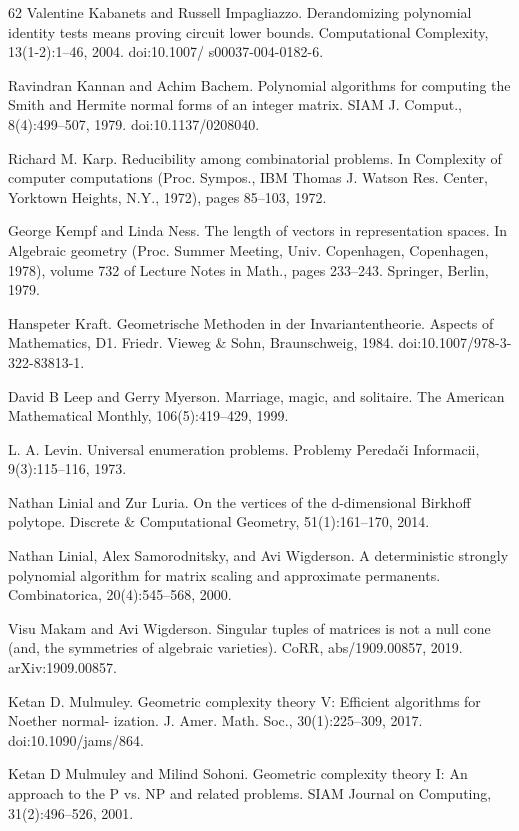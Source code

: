 \begin{thebibliography}{62}
Valentine Kabanets and Russell Impagliazzo. Derandomizing polynomial identity tests means proving circuit lower bounds. Computational Complexity, 13(1-2):1–46, 2004. doi:10.1007/ s00037-004-0182-6.

Ravindran Kannan and Achim Bachem. Polynomial algorithms for computing the Smith and Hermite normal forms of an integer matrix. SIAM J. Comput., 8(4):499–507, 1979. doi:10.1137/0208040.

Richard M. Karp. Reducibility among combinatorial problems. In Complexity of computer computations (Proc. Sympos., IBM Thomas J. Watson Res. Center, Yorktown Heights, N.Y., 1972), pages 85–103, 1972.

George Kempf and Linda Ness. The length of vectors in representation spaces. In Algebraic geometry (Proc. Summer Meeting, Univ. Copenhagen, Copenhagen, 1978), volume 732 of Lecture Notes in Math., pages 233–243. Springer, Berlin, 1979.

Hanspeter Kraft. Geometrische Methoden in der Invariantentheorie. Aspects of Mathematics, D1. Friedr. Vieweg \& Sohn, Braunschweig, 1984. doi:10.1007/978-3-322-83813-1.

David B Leep and Gerry Myerson. Marriage, magic, and solitaire. The American Mathematical Monthly, 106(5):419–429, 1999.

L. A. Levin. Universal enumeration problems. Problemy Peredači Informacii, 9(3):115–116, 1973.

Nathan Linial and Zur Luria. On the vertices of the d-dimensional Birkhoff polytope. Discrete \& Computational Geometry, 51(1):161–170, 2014.

Nathan Linial, Alex Samorodnitsky, and Avi Wigderson. A deterministic strongly polynomial algorithm for matrix scaling and approximate permanents. Combinatorica, 20(4):545–568, 2000.

Visu Makam and Avi Wigderson. Singular tuples of matrices is not a null cone (and, the symmetries of algebraic varieties). CoRR, abs/1909.00857, 2019. arXiv:1909.00857.

Ketan D. Mulmuley. Geometric complexity theory V: Efficient algorithms for Noether normal- ization. J. Amer. Math. Soc., 30(1):225–309, 2017. doi:10.1090/jams/864.

Ketan D Mulmuley and Milind Sohoni. Geometric complexity theory I: An approach to the P vs. NP and related problems. SIAM Journal on Computing, 31(2):496–526, 2001.


\end{thebibliography}
